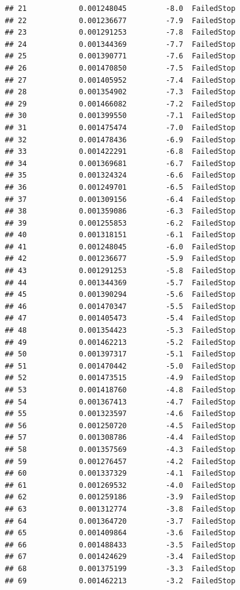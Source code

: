 \documentclass[
]{article}
\begin{document}
\begin{verbatim}
## 21            0.001248045         -8.0  FailedStop
## 22            0.001236677         -7.9  FailedStop
## 23            0.001291253         -7.8  FailedStop
## 24            0.001344369         -7.7  FailedStop
## 25            0.001390771         -7.6  FailedStop
## 26            0.001470850         -7.5  FailedStop
## 27            0.001405952         -7.4  FailedStop
## 28            0.001354902         -7.3  FailedStop
## 29            0.001466082         -7.2  FailedStop
## 30            0.001399550         -7.1  FailedStop
## 31            0.001475474         -7.0  FailedStop
## 32            0.001478436         -6.9  FailedStop
## 33            0.001422291         -6.8  FailedStop
## 34            0.001369681         -6.7  FailedStop
## 35            0.001324324         -6.6  FailedStop
## 36            0.001249701         -6.5  FailedStop
## 37            0.001309156         -6.4  FailedStop
## 38            0.001359086         -6.3  FailedStop
## 39            0.001255853         -6.2  FailedStop
## 40            0.001318151         -6.1  FailedStop
## 41            0.001248045         -6.0  FailedStop
## 42            0.001236677         -5.9  FailedStop
## 43            0.001291253         -5.8  FailedStop
## 44            0.001344369         -5.7  FailedStop
## 45            0.001390294         -5.6  FailedStop
## 46            0.001470347         -5.5  FailedStop
## 47            0.001405473         -5.4  FailedStop
## 48            0.001354423         -5.3  FailedStop
## 49            0.001462213         -5.2  FailedStop
## 50            0.001397317         -5.1  FailedStop
## 51            0.001470442         -5.0  FailedStop
## 52            0.001473515         -4.9  FailedStop
## 53            0.001418760         -4.8  FailedStop
## 54            0.001367413         -4.7  FailedStop
## 55            0.001323597         -4.6  FailedStop
## 56            0.001250720         -4.5  FailedStop
## 57            0.001308786         -4.4  FailedStop
## 58            0.001357569         -4.3  FailedStop
## 59            0.001276457         -4.2  FailedStop
## 60            0.001337329         -4.1  FailedStop
## 61            0.001269532         -4.0  FailedStop
## 62            0.001259186         -3.9  FailedStop
## 63            0.001312774         -3.8  FailedStop
## 64            0.001364720         -3.7  FailedStop
## 65            0.001409864         -3.6  FailedStop
## 66            0.001488433         -3.5  FailedStop
## 67            0.001424629         -3.4  FailedStop
## 68            0.001375199         -3.3  FailedStop
## 69            0.001462213         -3.2  FailedStop

\end{verbatim}
\end{document}
